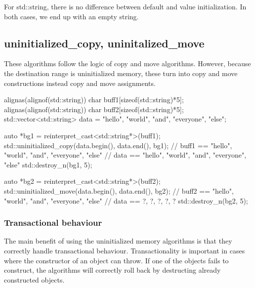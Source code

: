 For std::string, there is no difference between default and value initialization. In both cases, we end up with an empty string.

\subsection{uninitialized\_copy, uninitalized\_move}



These algorithms follow the logic of copy and move algorithms. However, because the destination range is uninitialized memory, these turn into copy and move constructions instead copy and move assignments.

\begin{box-note}
\begin{cppcode}
alignas(alignof(std::string)) char buff1[sizeof(std::string)*5];
alignas(alignof(std::string)) char buff2[sizeof(std::string)*5];
std::vector<std::string> data = {"hello", "world", "and", "everyone", "else"};

auto *bg1 = reinterpret_cast<std::string*>(buff1);
std::uninitialized_copy(data.begin(), data.end(), bg1);
// buff1 == { "hello", "world", "and", "everyone", "else"}
// data == { "hello", "world", "and", "everyone", "else"}
std::destroy_n(bg1, 5);

auto *bg2 = reinterpret_cast<std::string*>(buff2);
std::uninitialized_move(data.begin(), data.end(), bg2); 
// buff2 == { "hello", "world", "and", "everyone", "else"}
// data == { ?, ?, ?, ?, ?}
std::destroy_n(bg2, 5);
\end{cppcode}
\end{box-note}

\subsubsection{Transactional behaviour}

The main benefit of using the uninitialized memory algorithms is that they correctly handle transactional behaviour. Transactionality is important in cases where the constructor of an object can throw. If one of the objects fails to construct, the algorithms will correctly roll back by destructing already constructed objects.

